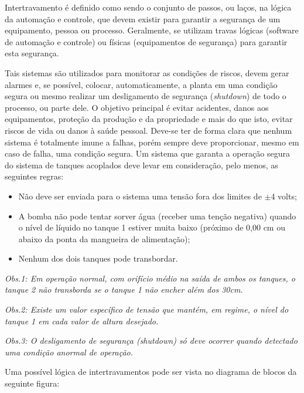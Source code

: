 \hspace{4ex}Intertravamento é definido como sendo o conjunto de passos, ou laços, na lógica da automação e controle, que devem existir para garantir a segurança de um equipamento, pessoa ou processo. Geralmente, se utilizam travas lógicas (software de automação e controle) ou físicas (equipamentos de segurança) para garantir esta segurança.

\hspace{4ex}Tais sistemas são utilizados para monitorar as condições de riscos, devem gerar alarmes e, se possível, colocar, automaticamente, a planta em uma condição segura ou mesmo realizar um desligamento de segurança (\textit{shutdown}) de todo o processo, ou parte dele. O objetivo principal é evitar acidentes, danos aos equipamentos, proteção da produção e da propriedade e mais do que isto, evitar riscos de vida ou danos à saúde pessoal. Deve-se ter de forma clara que nenhum sistema é totalmente imune a falhas, porém sempre deve proporcionar, mesmo em caso de falha, uma condição segura.\newline
\hspace{4ex}Um sistema que garanta a operação segura do sistema de tanques acoplados deve levar em consideração, pelo menos, as seguintes regras:
\begin{itemize}
    \item Não deve ser enviada para o sistema uma tensão fora dos limites de \(\pm\)4 volts;
    \item A bomba não pode tentar sorver água (receber uma tenção negativa) quando o nível de líquido no tanque 1 estiver muita baixo (próximo de 0,00 cm ou abaixo da ponta da mangueira de alimentação);
    \item Nenhum dos dois tanques pode transbordar.
\end{itemize}

\textit{Obs.1: Em operação normal, com orifício médio na saída de ambos os tanques, o tanque 2 não transborda se o tanque 1 não encher além dos 30cm.} \newline

\textit{Obs.2: Existe um valor específico de tensão que mantém, em regime, o nível do tanque 1 em cada valor de altura desejado.} \newline

\textit{Obs.3: O desligamento de segurança (shutdown) só deve ocorrer quando detectado uma condição anormal de operação.} \newline

\hspace{4ex} Uma possível lógica de intertravamentos pode ser vista no diagrama de blocos da seguinte figura:

